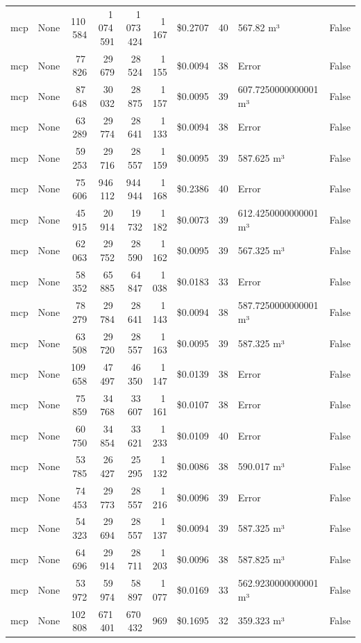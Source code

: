 \documentclass[a4paper,11pt]{article}
\begin{document}
\begin{table}[H]
{\begin{tabular}{l r r r r r r r l r}
mcp & None & 110\,584 & 1\,074\,591 & 1\,073\,424 & 1\,167 & \$0.2707 & 40 & 567.82 m³ & False \\
mcp & None & 77\,826 & 29\,679 & 28\,524 & 1\,155 & \$0.0094 & 38 & Error & False \\
mcp & None & 87\,648 & 30\,032 & 28\,875 & 1\,157 & \$0.0095 & 39 & 607.7250000000001 m³ & False \\
mcp & None & 63\,289 & 29\,774 & 28\,641 & 1\,133 & \$0.0094 & 38 & Error & False \\
mcp & None & 59\,253 & 29\,716 & 28\,557 & 1\,159 & \$0.0095 & 39 & 587.625 m³ & False \\
mcp & None & 75\,606 & 946\,112 & 944\,944 & 1\,168 & \$0.2386 & 40 & Error & False \\
mcp & None & 45\,915 & 20\,914 & 19\,732 & 1\,182 & \$0.0073 & 39 & 612.4250000000001 m³ & False \\
mcp & None & 62\,063 & 29\,752 & 28\,590 & 1\,162 & \$0.0095 & 39 & 567.325 m³ & False \\
mcp & None & 58\,352 & 65\,885 & 64\,847 & 1\,038 & \$0.0183 & 33 & Error & False \\
mcp & None & 78\,279 & 29\,784 & 28\,641 & 1\,143 & \$0.0094 & 38 & 587.7250000000001 m³ & False \\
mcp & None & 63\,508 & 29\,720 & 28\,557 & 1\,163 & \$0.0095 & 39 & 587.325 m³ & False \\
mcp & None & 109\,658 & 47\,497 & 46\,350 & 1\,147 & \$0.0139 & 38 & Error & False \\
mcp & None & 75\,859 & 34\,768 & 33\,607 & 1\,161 & \$0.0107 & 38 & Error & False \\
mcp & None & 60\,750 & 34\,854 & 33\,621 & 1\,233 & \$0.0109 & 40 & Error & False \\
mcp & None & 53\,785 & 26\,427 & 25\,295 & 1\,132 & \$0.0086 & 38 & 590.017 m³ & False \\
mcp & None & 74\,453 & 29\,773 & 28\,557 & 1\,216 & \$0.0096 & 39 & Error & False \\
mcp & None & 54\,323 & 29\,694 & 28\,557 & 1\,137 & \$0.0094 & 39 & 587.325 m³ & False \\
mcp & None & 64\,696 & 29\,914 & 28\,711 & 1\,203 & \$0.0096 & 38 & 587.825 m³ & False \\
mcp & None & 53\,972 & 59\,974 & 58\,897 & 1\,077 & \$0.0169 & 33 & 562.9230000000001 m³ & False \\
mcp & None & 102\,808 & 671\,401 & 670\,432 & 969 & \$0.1695 & 32 & 359.323 m³ & False \\

\end{tabular}}
\end{table}
\end{document}
